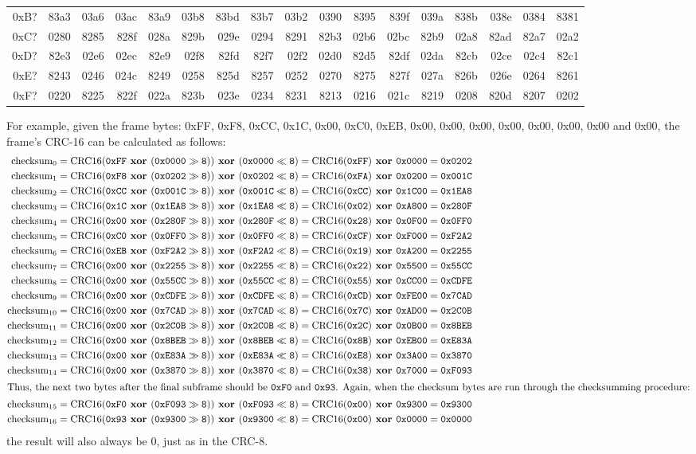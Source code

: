 \begin{table}[h]
{\begin{tabular}{|r||r|r|r|r|r|r|r|r|r|r|r|r|r|r|r|r|}
0xB? & 83a3 & 03a6 & 03ac & 83a9 & 03b8 & 83bd & 83b7 & 03b2 & 0390 & 8395 & 839f & 039a & 838b & 038e & 0384 & 8381 \\
0xC? & 0280 & 8285 & 828f & 028a & 829b & 029e & 0294 & 8291 & 82b3 & 02b6 & 02bc & 82b9 & 02a8 & 82ad & 82a7 & 02a2 \\
0xD? & 82e3 & 02e6 & 02ec & 82e9 & 02f8 & 82fd & 82f7 & 02f2 & 02d0 & 82d5 & 82df & 02da & 82cb & 02ce & 02c4 & 82c1 \\
0xE? & 8243 & 0246 & 024c & 8249 & 0258 & 825d & 8257 & 0252 & 0270 & 8275 & 827f & 027a & 826b & 026e & 0264 & 8261 \\
0xF? & 0220 & 8225 & 822f & 022a & 823b & 023e & 0234 & 8231 & 8213 & 0216 & 021c & 8219 & 0208 & 820d & 8207 & 0202 \\
\hline
\end{tabular}
}
\end{table}
\par
\noindent
For example, given the frame bytes:
0xFF, 0xF8, 0xCC, 0x1C, 0x00, 0xC0, 0xEB, 0x00, 0x00, 0x00, 0x00,
0x00, 0x00, 0x00 and 0x00, the frame's CRC-16 can be calculated as
follows:
{
\begin{align*}
\CRCSIXTEEN{0}{0xFF}{0x0000}{0xFF}{0x0000}{0x0202} \\
\CRCSIXTEEN{1}{0xF8}{0x0202}{0xFA}{0x0200}{0x001C} \\
\CRCSIXTEEN{2}{0xCC}{0x001C}{0xCC}{0x1C00}{0x1EA8} \\
\CRCSIXTEEN{3}{0x1C}{0x1EA8}{0x02}{0xA800}{0x280F} \\
\CRCSIXTEEN{4}{0x00}{0x280F}{0x28}{0x0F00}{0x0FF0} \\
\CRCSIXTEEN{5}{0xC0}{0x0FF0}{0xCF}{0xF000}{0xF2A2} \\
\CRCSIXTEEN{6}{0xEB}{0xF2A2}{0x19}{0xA200}{0x2255} \\
\CRCSIXTEEN{7}{0x00}{0x2255}{0x22}{0x5500}{0x55CC} \\
\CRCSIXTEEN{8}{0x00}{0x55CC}{0x55}{0xCC00}{0xCDFE} \\
\CRCSIXTEEN{9}{0x00}{0xCDFE}{0xCD}{0xFE00}{0x7CAD} \\
\CRCSIXTEEN{10}{0x00}{0x7CAD}{0x7C}{0xAD00}{0x2C0B} \\
\CRCSIXTEEN{11}{0x00}{0x2C0B}{0x2C}{0x0B00}{0x8BEB} \\
\CRCSIXTEEN{12}{0x00}{0x8BEB}{0x8B}{0xEB00}{0xE83A} \\
\CRCSIXTEEN{13}{0x00}{0xE83A}{0xE8}{0x3A00}{0x3870} \\
\CRCSIXTEEN{14}{0x00}{0x3870}{0x38}{0x7000}{0xF093} \\
\intertext{Thus, the next two bytes after the final subframe should be
\texttt{0xF0} and \texttt{0x93}.
Again, when the checksum bytes are run through the checksumming procedure:}
\CRCSIXTEEN{15}{0xF0}{0xF093}{0x00}{0x9300}{0x9300} \\
\CRCSIXTEEN{16}{0x93}{0x9300}{0x00}{0x0000}{0x0000}
\end{align*}
the result will also always be 0, just as in the CRC-8.
}
